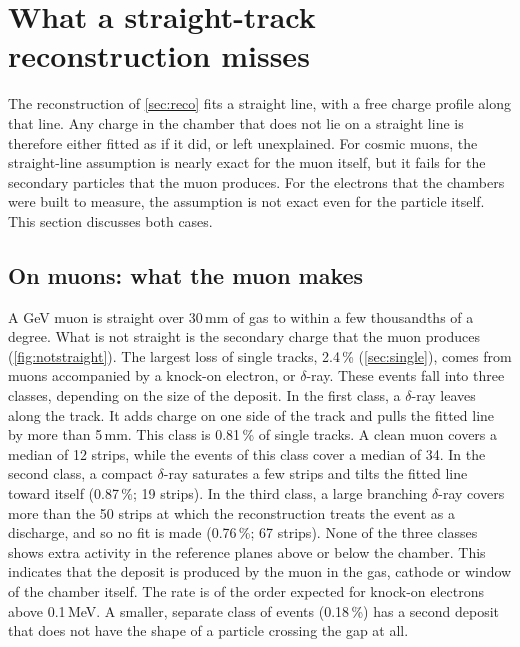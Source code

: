 \section{What a straight-track reconstruction misses}\label{sec:straight}

The reconstruction of \cref{sec:reco} fits a straight line, with a free charge profile along that line. Any charge in
the chamber that does not lie on a straight line is therefore either fitted as if it did, or left unexplained. For
cosmic muons, the straight-line assumption is nearly exact for the muon itself, but it fails for the secondary
particles that the muon produces. For the electrons that the chambers were built to measure, the assumption is not
exact even for the particle itself. This section discusses both cases.

\subsection{On muons: what the muon makes}\label{sec:delta}
A GeV muon is straight over 30\,mm of gas to within a few thousandths of a degree. What is not straight is the
secondary charge that the muon produces (\cref{fig:notstraight}). The largest loss of single tracks, 2.4\,\%
(\cref{sec:single}), comes from muons accompanied by a knock-on electron, or $\delta$-ray. These events fall into three
classes, depending on the size of the deposit. In the first class, a $\delta$-ray leaves along the track. It adds
charge on one side of the track and pulls the fitted line by more than 5\,mm. This class is 0.81\,\% of single tracks.
A clean muon covers a median of 12 strips, while the events of this class cover a median of 34. In the second class, a
compact $\delta$-ray saturates a few strips and tilts the fitted line toward itself (0.87\,\%; 19 strips). In the third
class, a large branching $\delta$-ray covers more than the 50 strips at which the reconstruction treats the event as a
discharge, and so no fit is made (0.76\,\%; 67 strips). None of the three classes shows extra activity in the reference
planes above or below the chamber. This indicates that the deposit is produced by the muon in the gas, cathode or
window of the chamber itself. The rate is of the order expected for knock-on electrons above 0.1\,MeV. A smaller,
separate class of events (0.18\,\%) has a second deposit that does not have the shape of a particle crossing the gap
at all.

